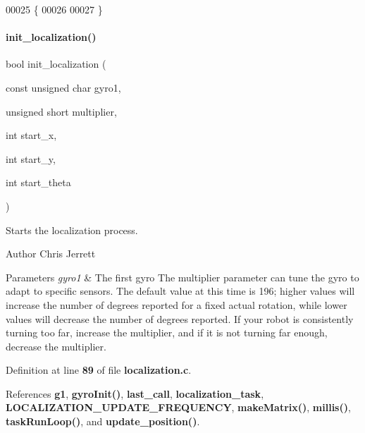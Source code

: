 \begin{DoxyCode}
00025                                \{
00026 
00027 \}
\end{DoxyCode}
\mbox{\label{localization_8c_afdd0147de6aa15957e9a125f9cd20578}} 
\paragraph{init\+\_\+localization()}
{\footnotesize\ttfamily bool init\+\_\+localization (\begin{DoxyParamCaption}\item[{const unsigned char}]{gyro1,  }\item[{unsigned short}]{multiplier,  }\item[{int}]{start\+\_\+x,  }\item[{int}]{start\+\_\+y,  }\item[{int}]{start\+\_\+theta }\end{DoxyParamCaption})}



Starts the localization process. 

\begin{DoxyAuthor}{Author}
Chris Jerrett
\end{DoxyAuthor}

\begin{DoxyParams}{Parameters}
{\em gyro1} & The first gyro  The multiplier parameter can tune the gyro to adapt to specific sensors. The default value at this time is 196; higher values will increase the number of degrees reported for a fixed actual rotation, while lower values will decrease the number of degrees reported. If your robot is consistently turning too far, increase the multiplier, and if it is not turning far enough, decrease the multiplier. \\
\hline
\end{DoxyParams}


Definition at line \textbf{ 89} of file \textbf{ localization.\+c}.



References \textbf{ g1}, \textbf{ gyro\+Init()}, \textbf{ last\+\_\+call}, \textbf{ localization\+\_\+task}, \textbf{ L\+O\+C\+A\+L\+I\+Z\+A\+T\+I\+O\+N\+\_\+\+U\+P\+D\+A\+T\+E\+\_\+\+F\+R\+E\+Q\+U\+E\+N\+CY}, \textbf{ make\+Matrix()}, \textbf{ millis()}, \textbf{ task\+Run\+Loop()}, and \textbf{ update\+\_\+position()}.


